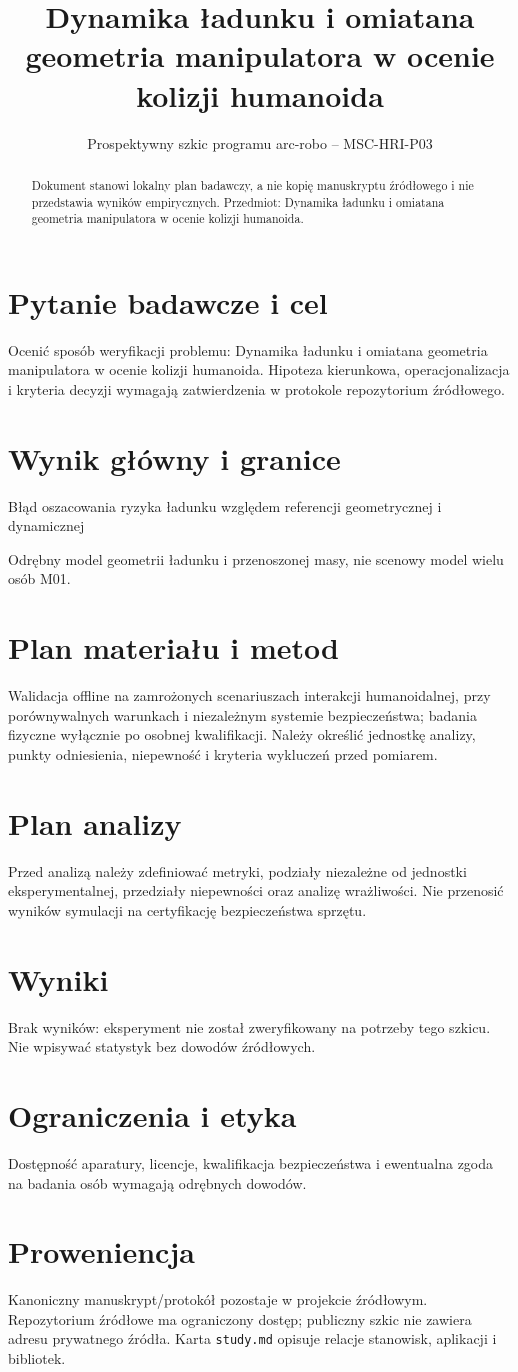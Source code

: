 \documentclass[11pt,a4paper]{article}
\title{Dynamika ładunku i omiatana geometria manipulatora w ocenie kolizji humanoida}
\author{}
\date{Prospektywny szkic programu arc-robo -- MSC-HRI-P03}
\begin{document}
\maketitle
\begin{abstract}
Dokument stanowi lokalny plan badawczy, a nie kopię manuskryptu źródłowego i nie przedstawia wyników empirycznych. Przedmiot: Dynamika ładunku i omiatana geometria manipulatora w ocenie kolizji humanoida.
\end{abstract}
\section{Pytanie badawcze i cel}
Ocenić sposób weryfikacji problemu: Dynamika ładunku i omiatana geometria manipulatora w ocenie kolizji humanoida. Hipoteza kierunkowa, operacjonalizacja i kryteria decyzji wymagają zatwierdzenia w protokole repozytorium źródłowego.
\section{Wynik główny i granice}
Błąd oszacowania ryzyka ładunku względem referencji geometrycznej i dynamicznej

Odrębny model geometrii ładunku i przenoszonej masy, nie scenowy model wielu osób M01.
\section{Plan materiału i metod}
Walidacja offline na zamrożonych scenariuszach interakcji humanoidalnej, przy porównywalnych warunkach i niezależnym systemie bezpieczeństwa; badania fizyczne wyłącznie po osobnej kwalifikacji. Należy określić jednostkę analizy, punkty odniesienia, niepewność i kryteria wykluczeń przed pomiarem.
\section{Plan analizy}
Przed analizą należy zdefiniować metryki, podziały niezależne od jednostki eksperymentalnej, przedziały niepewności oraz analizę wrażliwości. Nie przenosić wyników symulacji na certyfikację bezpieczeństwa sprzętu.
\section{Wyniki}
Brak wyników: eksperyment nie został zweryfikowany na potrzeby tego szkicu. Nie wpisywać statystyk bez dowodów źródłowych.
\section{Ograniczenia i etyka}
Dostępność aparatury, licencje, kwalifikacja bezpieczeństwa i ewentualna zgoda na badania osób wymagają odrębnych dowodów.
\section{Proweniencja}
Kanoniczny manuskrypt/protokół pozostaje w projekcie źródłowym. Repozytorium źródłowe ma ograniczony dostęp; publiczny szkic nie zawiera adresu prywatnego źródła. Karta \texttt{study.md} opisuje relacje stanowisk, aplikacji i bibliotek.
\end{document}
